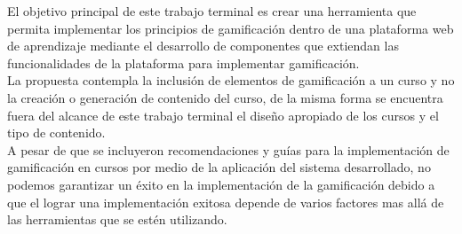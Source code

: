  El objetivo principal de este trabajo terminal es crear una herramienta que permita
 implementar los principios de gamificación dentro de una plataforma web de aprendizaje
 mediante el desarrollo de componentes que extiendan las funcionalidades de la
 plataforma para implementar gamificación.\\

 \noindent La propuesta contempla la inclusión de elementos de gamificación
 a un curso y no la creación o generación de contenido del curso, de la misma forma
 se encuentra fuera del alcance de este trabajo terminal el diseño apropiado de los
 cursos y el tipo de contenido.\\

 \noindent A pesar de que se incluyeron recomendaciones y guías para la implementación
 de gamificación en cursos por medio de la aplicación del sistema desarrollado,
 no podemos garantizar un éxito en la implementación de
 la gamificación debido a que el lograr una implementación exitosa depende de varios
 factores mas allá de las herramientas que se estén utilizando.

